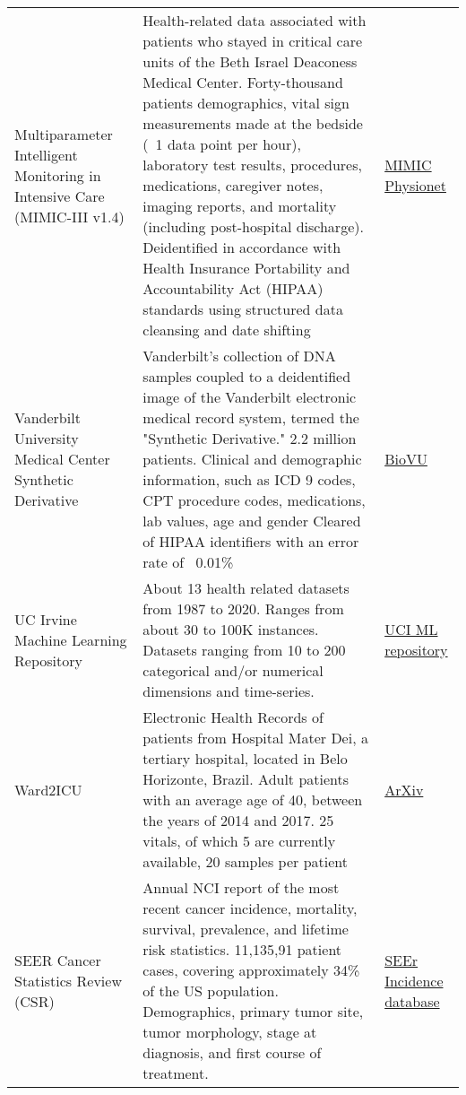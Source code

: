 \begin{table}[H]
\begin{tabular}{@{}p{} p{}p{}@{}}
    Multiparameter Intelligent Monitoring in Intensive Care (MIMIC-III v1.4) \cite{Johnson_2016} &   Health-related data associated with patients who stayed in critical care units of the Beth Israel Deaconess Medical Center.  Forty-thousand patients demographics, vital sign measurements made at the bedside (~1 data point per hour), laboratory test results, procedures, medications, caregiver notes, imaging reports, and mortality (including post-hospital discharge).  Deidentified in accordance with Health Insurance Portability and Accountability Act (HIPAA) standards using structured data cleansing and date shifting  & \href{https://mimic.physionet.org}{MIMIC Physionet} \cite{Goldberger_2000}\\
    
    Vanderbilt University Medical Center Synthetic Derivative \cite{Roden_2008} &   Vanderbilt's collection of DNA samples coupled to a deidentified image of the Vanderbilt electronic medical record system, termed the "Synthetic Derivative." 2.2 million patients. Clinical and demographic information, such as ICD 9 codes, CPT procedure codes, medications, lab values, age and gender Cleared of HIPAA identifiers with an error rate of ~0.01\%  & \href{https://victr.vumc.org/biovu-description/}{BioVU}\\
    
    UC Irvine Machine Learning Repository \cite{Dua:2019} & About 13 health related datasets from 1987 to 2020.  Ranges from about 30 to 100K instances.  Datasets ranging from 10 to 200 categorical and/or numerical dimensions and time-series.& \href{http://archive.ics.uci.edu/ml/index.php }{UCI ML repository}\\
    
    Ward2ICU \cite{severo2019ward2icu} &   Electronic Health Records of patients from Hospital Mater Dei, a tertiary hospital, located in Belo Horizonte, Brazil.  Adult patients with an average age of 40, between the years of 2014 and 2017.  25 vitals, of which 5 are currently available, 20 samples per patient  & \href{https://arxiv.org/abs/1910.00752}{ArXiv}\\
    
    SEER Cancer Statistics Review (CSR) \cite{noone2018cronin}  &   Annual NCI report of the most recent cancer incidence, mortality, survival, prevalence, and lifetime risk statistics.  11,135,91 patient cases, covering approximately 34\% of the US population.  Demographics, primary tumor site, tumor morphology, stage at diagnosis, and first course of treatment.   & \href{https://seer.cancer.gov/data/access.html}{SEEr Incidence database}\\
    

\end{tabular}
\end{table}
